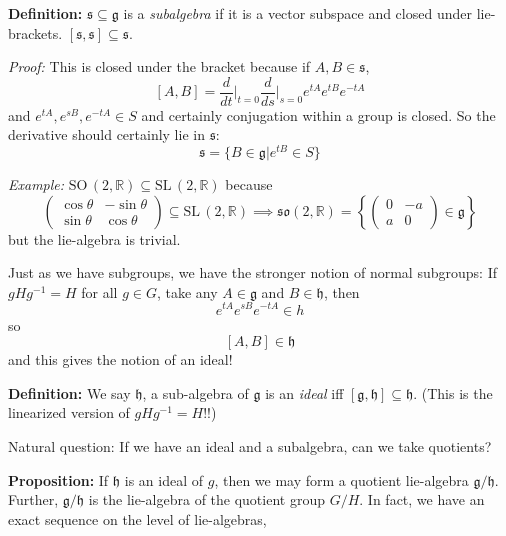 \documentclass[12pt]{article}
\newcommand{\R}{\mathbb{R}}
\newcommand{\SL}{\text{SL}\,}
\newcommand{\SO}{\text{SO}\,}
\newcommand{\g}{\mathfrak{g}}
\renewcommand{\sf}{\mathfrak{s}}
\newcommand{\h}{\mathfrak{h}}
\newenvironment*{tbox}[2][gray]{
    \begin{tcolorbox}[
        parbox=false,
        colback=#1!5!white,
        colframe=#1!75!black,
        breakable,
        title={#2}
    ]}
    {\end{tcolorbox}}
\begin{document}
    \textbf{Definition:} $\mathfrak{s} \subseteq \g$ is a \emph{subalgebra} if it is a vector subspace and closed under lie-brackets. $[\mathfrak{s}, \mathfrak{s}] \subseteq \mathfrak{s}$.

    \begin{tbox}{\textbf{Theorem:} There is a correspondence between sub-algebras of $\g$ and connected lie-subgroups of $G$. 
        \[S \subseteq G \to T_1 S \subseteq T_1 G \implies \sf \subseteq \g\]}
    
        \emph{Proof:} This is closed under the bracket because if $A, B \in \sf$, 
        \[[A, B] = \frac{d}{dt}\bigg\vert_{t=0} \frac{d}{ds}\bigg\vert_{s=0} e^{tA}e^{tB}e^{-tA}\] 
        and $e^{tA}, e^{sB}, e^{-tA} \in S$ and certainly conjugation within a group is closed. So the derivative should certainly lie in $\sf$: 
        \[\sf = \{B \in \g \big\vert e^{tB} \in S\}\]
    \end{tbox}

    \emph{Example:} $\SO(2, \R) \subseteq \SL(2, \R)$ because 
    \[\begin{pmatrix}
        \cos \theta & -\sin \theta\\ 
        \sin \theta & \cos \theta
    \end{pmatrix} \subseteq \SL(2, \R) \implies \mathfrak{so}(2, \R) = \left\{\begin{pmatrix}
        0 & -a\\ 
        a & 0
    \end{pmatrix} \in \g\right\}\]
    but the lie-algebra is trivial. 

    Just as we have subgroups, we have the stronger notion of normal subgroups: If $gHg^{-1} = H$ for all $g \in G$, take any $A \in \g$ and $B \in \mathfrak{h}$, then 
    \[e^{tA}e^{sB}e^{-tA} \in h\]
    so 
    \[[A, B] \in \mathfrak{h}\]
    and this gives the notion of an ideal!

    \textbf{Definition:} We say $\mathfrak{h}$, a sub-algebra of $\g$ is an \emph{ideal} iff $[\g, \mathfrak{h}] \subseteq \mathfrak{h}$. (This is the linearized version of $gHg^{-1} = H$!!)

    Natural question: If we have an ideal and a subalgebra, can we take quotients? 

    \textbf{Proposition:} If $\mathfrak{h}$ is an ideal of $g$, then we may form a quotient lie-algebra $\g/\h$. Further, $\g/\h$ is the lie-algebra of the quotient group $G/H$. In fact, we have an exact sequence on the level of lie-algebras,
\end{document}

